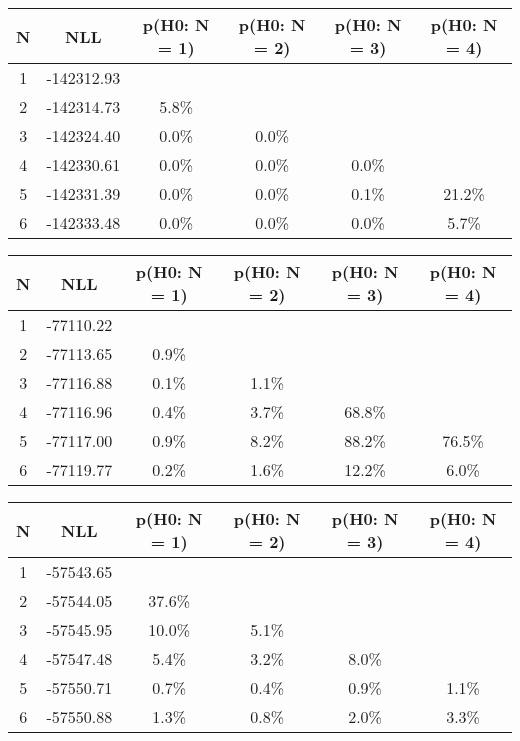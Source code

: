 \begin{table}[htb]
	\begin{center}
{\footnotesize\renewcommand{\arraystretch}{1.4}
		\begin{tabular}{cc||cccc}
			N & NLL & p(H0: N = 1) & p(H0: N = 2) & p(H0: N = 3) & p(H0: N = 4)\\ 
		\hline
1 & -142312.93 & & & & \\
2 & -142314.73 & 5.8\% & & & \\
3 & -142324.40 & 0.0\% & 0.0\% & & \\
4 & -142330.61 & 0.0\% & 0.0\% & 0.0\% & \\
5 & -142331.39 & 0.0\% & 0.0\% & 0.1\% & 21.2\% \\
6 & -142333.48 & 0.0\% & 0.0\% & 0.0\% & 5.7\% \\
	\end{tabular}
		\label{tab:lab}
	}
	\end{center}\end{table}

\begin{table}[htb]
	\begin{center}
{\footnotesize\renewcommand{\arraystretch}{1.4}
		\begin{tabular}{cc||cccc}
			N & NLL & p(H0: N = 1) & p(H0: N = 2) & p(H0: N = 3) & p(H0: N = 4)\\ 
		\hline
1 & -77110.22 & & & & \\
2 & -77113.65 & 0.9\% & & & \\
3 & -77116.88 & 0.1\% & 1.1\% & & \\
4 & -77116.96 & 0.4\% & 3.7\% & 68.8\% & \\
5 & -77117.00 & 0.9\% & 8.2\% & 88.2\% & 76.5\% \\
6 & -77119.77 & 0.2\% & 1.6\% & 12.2\% & 6.0\% \\
	\end{tabular}
		\label{tab:lab}
	}
	\end{center}\end{table}

\begin{table}[htb]
	\begin{center}
{\footnotesize\renewcommand{\arraystretch}{1.4}
		\begin{tabular}{cc||cccc}
			N & NLL & p(H0: N = 1) & p(H0: N = 2) & p(H0: N = 3) & p(H0: N = 4)\\ 
		\hline
1 & -57543.65 & & & & \\
2 & -57544.05 & 37.6\% & & & \\
3 & -57545.95 & 10.0\% & 5.1\% & & \\
4 & -57547.48 & 5.4\% & 3.2\% & 8.0\% & \\
5 & -57550.71 & 0.7\% & 0.4\% & 0.9\% & 1.1\% \\
6 & -57550.88 & 1.3\% & 0.8\% & 2.0\% & 3.3\% \\
	\end{tabular}
		\label{tab:lab}
	}
	\end{center}\end{table}

